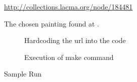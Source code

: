 \documentclass{article}
\begin{document}
\begin{flushleft}
\begin{figure}[H]
\centering
{}
\urldef\myurl\url{http://collections.lacma.org/node/184481}
\caption{The chosen painting found at \myurl.}
\end{figure}

\begin{figure}[H]
\centering
\begin{subfigure}{0.5\textwidth}
\centering
{}
\caption{Hardcoding the url into the code}
\end{subfigure}%
\begin{subfigure}{0.5\textwidth}
\centering
{}
\caption{Execution of make command}
\end{subfigure}
\caption{Sample Run}
\end{figure}


\end{flushleft}
\end{document}
